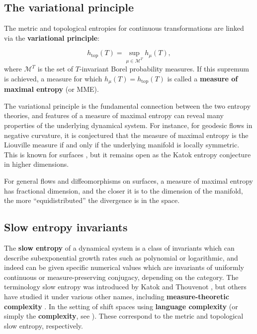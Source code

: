 \documentclass[oneside]{amsart}
\theoremstyle{plain}
\theoremstyle{definition}
\newcommand{\<}{\langle}
\renewcommand{\>}{\rangle}
\newcommand{\htop}{h_{\operatorname{top}}}
\renewcommand{\|}{|\!|} %
\begin{document}
\subsection{The variational principle}The metric and topological entropies for continuous transformations are linked via the {\bf  variational principle}:

\begin{equation}
    \label{eq:vprinciple-classic}
    \htop(T) = \sup_{\mu \in \mathcal M^T} h_\mu(T),
\end{equation}
where $\mathcal M^T$ is the set of $T$-invariant Borel probability measures. If this supremum is achieved, a measure for which $h_\mu(T) = \htop(T)$ is called a {\bf measure of maximal entropy} (or MME).

The variational principle is the fundamental connection between the two entropy theories, and features of a measure of maximal entropy can reveal many properties of the underlying dynamical system. For instance, for geodesic flows in negative curvature, it is conjectured that the measure of maximal entropy is the Liouville measure if and only if the underlying manifold is locally symmetric. This is known for surfaces \cite{Katok1982}, but it remains open as the Katok entropy conjecture in higher dimensions.

For general flows and diffeomorphisms on surfaces, a measure of maximal entropy has fractional dimension, and the closer it is to the dimension of the manifold, the more ``equidistributed'' the divergence is in the space.



\subsection{Slow entropy invariants}
The {\bf slow entropy} of a dynamical system is a class of invariants which can describe subexponential growth rates such as polynomial or logarithmic, and indeed can be given specific numerical values which are invariants of uniformly continuous or measure-preserving conjugacy, depending on the category. The terminology slow entropy was introduced by Katok and Thouvenot \cite{KatokThouvenot}, but others have studied it under various other names, including {\bf measure-theoretic complexity} \cite{Ferenczi0}. In the setting of shift spaces using {\bf language complexity} (or simply the {\bf complexity}, see ). These correspond to the metric and topological slow entropy, respectively.
\end{document}
